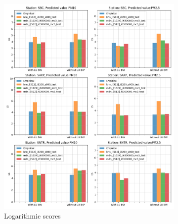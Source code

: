 \documentclass[12pt,a4paper,twoside]{scrartcl}
\numberwithin{equation}{section}
\newcounter{mypagecount}%
\newenvironment{interlude}{%
  \clearpage
  \setcounter{mypagecount}{\value{page}}%
  \thispagestyle{empty}%
  \pagestyle{empty}%
}{%
  \clearpage
  \setcounter{page}{\value{mypagecount}}%
}
\begin{document}
\begin{interlude}
\begin{appendices}
\begin{figure}[h!]
\begin{subfigure}[t]{0.49\textwidth}
        \includegraphics[width=\textwidth,height=1.2\textwidth]{figures/figs_12h/results_plot_LS}%
        \caption{Logarithmic scores}
      \end{subfigure}
      \begin{subfigure}[t]{0.49\textwidth}

\end{subfigure}
\end{figure}
\end{appendices}
\end{interlude}
\end{document}
